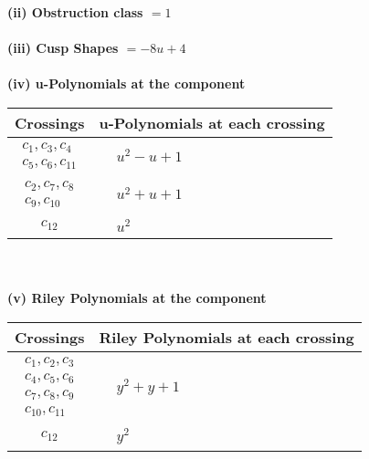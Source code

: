 \documentclass[1p]{elsarticle_modified}
\theoremstyle{definition}
\begin{document}
\flushleft \textbf{(ii) Obstruction class $= 1$}\\~\\
\flushleft \textbf{(iii) Cusp Shapes $= -8 u+4$}\\~\\
\newpage\renewcommand{\arraystretch}{1}
\flushleft \textbf{(iv) u-Polynomials at the component}\newline \\
\begin{tabular}{m{50pt}|m{274pt}}
Crossings & \hspace{64pt}u-Polynomials at each crossing \\
\hline $$\begin{aligned}c_{1},c_{3},c_{4}\\c_{5},c_{6},c_{11}\end{aligned}$$&$\begin{aligned}
&u^2- u+1
\end{aligned}$\\
\hline $$\begin{aligned}c_{2},c_{7},c_{8}\\c_{9},c_{10}\end{aligned}$$&$\begin{aligned}
&u^2+u+1
\end{aligned}$\\
\hline $$\begin{aligned}c_{12}\end{aligned}$$&$\begin{aligned}
&u^2
\end{aligned}$\\
\hline
\end{tabular}\\~\\
\newpage\renewcommand{\arraystretch}{1}
\flushleft \textbf{(v) Riley Polynomials at the component}\newline \\
\begin{tabular}{m{50pt}|m{274pt}}
Crossings & \hspace{64pt}Riley Polynomials at each crossing \\
\hline $$\begin{aligned}c_{1},c_{2},c_{3}\\c_{4},c_{5},c_{6}\\c_{7},c_{8},c_{9}\\c_{10},c_{11}\end{aligned}$$&$\begin{aligned}
&y^2+y+1
\end{aligned}$\\
\hline $$\begin{aligned}c_{12}\end{aligned}$$&$\begin{aligned}
&y^2
\end{aligned}$\\
\hline
\end{tabular}\\~\\
\end{document}
